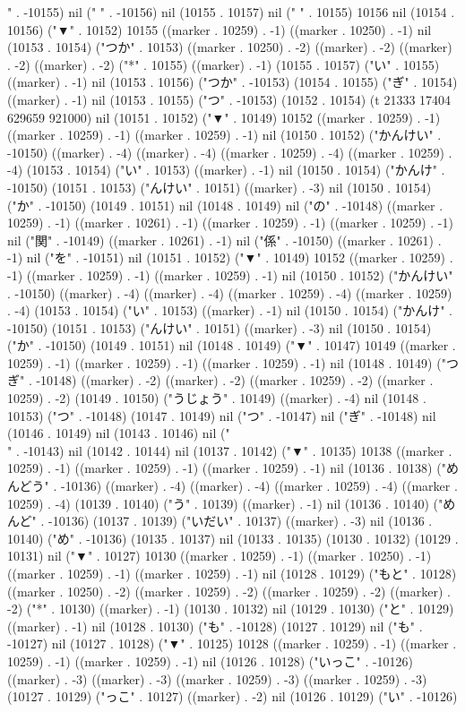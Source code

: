 " . -10155) nil (" " . -10156) nil (10155 . 10157) nil (" " . 10155) 10156 nil (10154 . 10156) ("▼" . 10152) 10155 ((marker . 10259) . -1) ((marker . 10250) . -1) nil (10153 . 10154) ("つか" . 10153) ((marker . 10250) . -2) ((marker) . -2) ((marker) . -2) ((marker) . -2) ("*" . 10155) ((marker) . -1) (10155 . 10157) ("い" . 10155) ((marker) . -1) nil (10153 . 10156) ("つか" . -10153) (10154 . 10155) ("ぎ" . 10154) ((marker) . -1) nil (10153 . 10155) ("つ" . -10153) (10152 . 10154) (t 21333 17404 629659 921000) nil (10151 . 10152) ("▼" . 10149) 10152 ((marker . 10259) . -1) ((marker . 10259) . -1) ((marker . 10259) . -1) nil (10150 . 10152) ("かんけい" . -10150) ((marker) . -4) ((marker) . -4) ((marker . 10259) . -4) ((marker . 10259) . -4) (10153 . 10154) ("い" . 10153) ((marker) . -1) nil (10150 . 10154) ("かんけ" . -10150) (10151 . 10153) ("んけい" . 10151) ((marker) . -3) nil (10150 . 10154) ("か" . -10150) (10149 . 10151) nil (10148 . 10149) nil ("の" . -10148) ((marker . 10259) . -1) ((marker . 10261) . -1) ((marker . 10259) . -1) ((marker . 10259) . -1) nil ("関" . -10149) ((marker . 10261) . -1) nil ("係" . -10150) ((marker . 10261) . -1) nil ("を" . -10151) nil (10151 . 10152) ("▼" . 10149) 10152 ((marker . 10259) . -1) ((marker . 10259) . -1) ((marker . 10259) . -1) nil (10150 . 10152) ("かんけい" . -10150) ((marker) . -4) ((marker) . -4) ((marker . 10259) . -4) ((marker . 10259) . -4) (10153 . 10154) ("い" . 10153) ((marker) . -1) nil (10150 . 10154) ("かんけ" . -10150) (10151 . 10153) ("んけい" . 10151) ((marker) . -3) nil (10150 . 10154) ("か" . -10150) (10149 . 10151) nil (10148 . 10149) ("▼" . 10147) 10149 ((marker . 10259) . -1) ((marker . 10259) . -1) ((marker . 10259) . -1) nil (10148 . 10149) ("つぎ" . -10148) ((marker) . -2) ((marker) . -2) ((marker . 10259) . -2) ((marker . 10259) . -2) (10149 . 10150) ("うじょう" . 10149) ((marker) . -4) nil (10148 . 10153) ("つ" . -10148) (10147 . 10149) nil ("つ" . -10147) nil ("ぎ" . -10148) nil (10146 . 10149) nil (10143 . 10146) nil ("\\" . -10143) nil (10142 . 10144) nil (10137 . 10142) ("▼" . 10135) 10138 ((marker . 10259) . -1) ((marker . 10259) . -1) ((marker . 10259) . -1) nil (10136 . 10138) ("めんどう" . -10136) ((marker) . -4) ((marker) . -4) ((marker . 10259) . -4) ((marker . 10259) . -4) (10139 . 10140) ("う" . 10139) ((marker) . -1) nil (10136 . 10140) ("めんど" . -10136) (10137 . 10139) ("いだい" . 10137) ((marker) . -3) nil (10136 . 10140) ("め" . -10136) (10135 . 10137) nil (10133 . 10135) (10130 . 10132) (10129 . 10131) nil ("▼" . 10127) 10130 ((marker . 10259) . -1) ((marker . 10250) . -1) ((marker . 10259) . -1) ((marker . 10259) . -1) nil (10128 . 10129) ("もと" . 10128) ((marker . 10250) . -2) ((marker . 10259) . -2) ((marker . 10259) . -2) ((marker) . -2) ("*" . 10130) ((marker) . -1) (10130 . 10132) nil (10129 . 10130) ("と" . 10129) ((marker) . -1) nil (10128 . 10130) ("も" . -10128) (10127 . 10129) nil ("も" . -10127) nil (10127 . 10128) ("▼" . 10125) 10128 ((marker . 10259) . -1) ((marker . 10259) . -1) ((marker . 10259) . -1) nil (10126 . 10128) ("いっこ" . -10126) ((marker) . -3) ((marker) . -3) ((marker . 10259) . -3) ((marker . 10259) . -3) (10127 . 10129) ("っこ" . 10127) ((marker) . -2) nil (10126 . 10129) ("い" . -10126) 